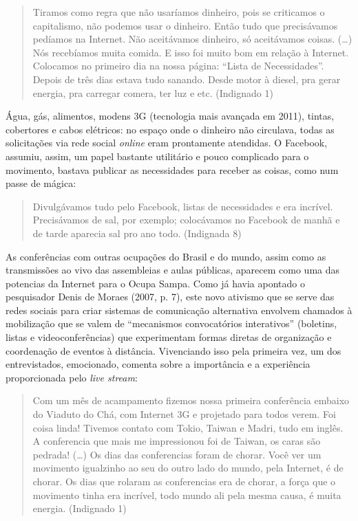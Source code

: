 \begin{quote}
Tiramos como regra que não usaríamos dinheiro, pois se criticamos o
capitalismo, não podemos usar o dinheiro. Então tudo que precisávamos
pedíamos na Internet. Não aceitávamos dinheiro, só aceitávamos coisas.
(\ldots{}) Nós recebíamos muita comida. E isso foi muito bom em relação à
Internet. Colocamos no primeiro dia na nossa página: ``Lista de
Necessidades''. Depois de três dias estava tudo sanando. Desde motor à
diesel, pra gerar energia, pra carregar comera, ter luz e etc.
(Indignado 1)
\end{quote}

Água, gás, alimentos, modens 3G (tecnologia mais avançada em 2011),
tintas, cobertores e cabos elétricos: no espaço onde o dinheiro não
circulava, todas as solicitações via rede social \emph{\emph{online}} eram prontamente
atendidas. O Facebook, assumiu, assim, um papel bastante utilitário e
pouco complicado para o movimento, bastava publicar as necessidades para
receber as coisas, como num passe de mágica:

\begin{quote}
Divulgávamos tudo pelo Facebook, listas de necessidades e era incrível.
Precisávamos de sal, por exemplo; colocávamos no Facebook de manhã e de
tarde aparecia sal pro ano todo. (Indignada 8)
\end{quote}

As conferências com outras ocupações do Brasil e do mundo, assim como as
transmissões ao vivo das assembleias e aulas públicas, aparecem como uma
das potencias da Internet para o Ocupa Sampa. Como já havia apontado o
pesquisador Denis de Moraes (2007, p. 7), este novo ativismo que se
serve das redes sociais para criar sistemas de comunicação alternativa
envolvem chamados à mobilização que se valem de ``mecanismos
convocatórios interativos'' (boletins, listas e videoconferências) que
experimentam formas diretas de organização e coordenação de eventos à
distância. Vivenciando isso pela primeira vez, um dos entrevistados,
emocionado, comenta sobre a importância e a experiência proporcionada
pelo \emph{live stream}:

\begin{quote}
Com um mês de acampamento fizemos nossa primeira conferência embaixo do
Viaduto do Chá, com Internet 3G e projetado para todos verem. Foi coisa
linda! Tivemos contato com Tokio, Taiwan e Madri, tudo em inglês. A
conferencia que mais me impressionou foi de Taiwan, os caras são
pedrada! (\ldots{}) Os dias das conferencias foram de chorar. Você ver um
movimento igualzinho ao seu do outro lado do mundo, pela Internet, é de
chorar. Os dias que rolaram as conferencias era de chorar, a força que o
movimento tinha era incrível, todo mundo ali pela mesma causa, é muita
energia. (Indignado 1)
\end{quote}

